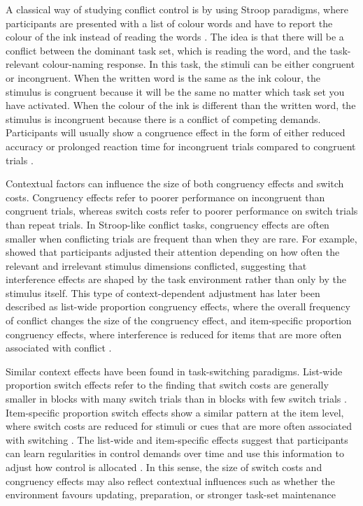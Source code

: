 \documentclass[12pt,a4paper]{report}
\begin{document}
A classical way of studying conflict control is by using Stroop paradigms, where participants are presented with a list of colour words and have to report the colour of the ink instead of reading the words \parencite{stroop1935interference}. The idea is that there will be a conflict between the dominant task set, which is reading the word, and the task-relevant colour-naming response. In this task, the stimuli can be either congruent or incongruent. When the written word is the same as the ink colour, the stimulus is congruent because it will be the same no matter which task set you have activated. When the colour of the ink is different than the written word, the stimulus is incongruent because there is a conflict of competing demands. Participants will usually show a congruence effect in the form of either reduced accuracy or prolonged reaction time for incongruent trials compared to congruent trials \parencite{macleod1991half,parris2022loci}.

Contextual factors can influence the size of both congruency effects and switch costs. Congruency effects refer to poorer performance on incongruent than congruent trials, whereas switch costs refer to poorer performance on switch trials than repeat trials. In Stroop-like conflict tasks, congruency effects are often smaller when conflicting trials are frequent than when they are rare. For example, \textcite{logan1979misled} showed that participants adjusted their attention depending on how often the relevant and irrelevant stimulus dimensions conflicted, suggesting that interference effects are shaped by the task environment rather than only by the stimulus itself. This type of context-dependent adjustment has later been described as list-wide proportion congruency effects, where the overall frequency of conflict changes the size of the congruency effect, and item-specific proportion congruency effects, where interference is reduced for items that are more often associated with conflict \parencite{bugg2012support,bugg2012dissociating}.

Similar context effects have been found in task-switching paradigms. List-wide proportion switch effects refer to the finding that switch costs are generally smaller in blocks with many switch trials than in blocks with few switch trials \parencite{siqiliu2020contextual,dreisbach2006preparatory,schneider2006priming}. Item-specific proportion switch effects show a similar pattern at the item level, where switch costs are reduced for stimuli or cues that are more often associated with switching \parencite{chiu2017cueing,kang2021proactive}. The list-wide and item-specific effects suggest that participants can learn regularities in control demands over time and use this information to adjust how control is allocated \parencite{egner2023principles}. In this sense, the size of switch costs and congruency effects may also reflect contextual influences such as whether the environment favours updating, preparation, or stronger task-set maintenance
\end{document}
